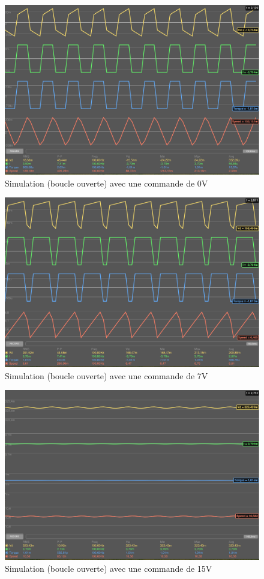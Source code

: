 \documentclass[a4paper]{article}
\begin{document}
\begin{figure}[H]
	\centering
	\includegraphics[width=1\textwidth]{simu0v}
	\caption{Simulation (boucle ouverte) avec une commande de 0V}
\end{figure}
\begin{figure}[H]
	\centering
	\includegraphics[width=1\textwidth]{simu7v}
	\caption{Simulation (boucle ouverte) avec une commande de 7V}
\end{figure}
\begin{figure}[H]
	\centering
	\includegraphics[width=1\textwidth]{simu15v}
	\caption{Simulation (boucle ouverte) avec une commande de 15V}
\end{figure}
\end{document}

